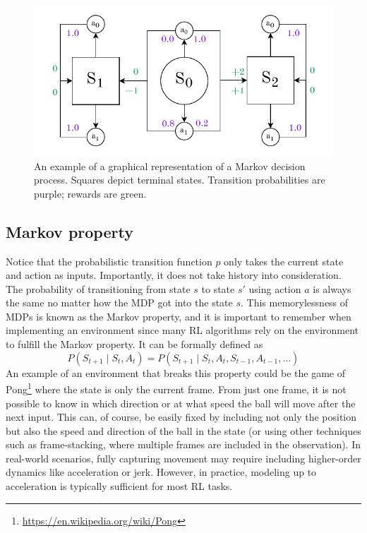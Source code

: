 \documentclass[
  digital,     %
  oneside,     %
  nosansbold,  %
  nocolorbold, %
  lof,         %
  lot,         %
]{fithesis4}
\begin{document}
\begin{figure}
    \centering
    \includegraphics[width=1\linewidth]{diagrams/mdp.pdf}
    \caption{An example of a graphical representation of a Markov decision process. Squares depict terminal states. Transition probabilities are purple; rewards are green.}
    \label{fig:mdp}
\end{figure}

\subsection{Markov property}
Notice that the probabilistic transition function $p$ only takes the current state and action as inputs. Importantly, it does not take history into consideration. The probability of transitioning from state $s$ to state $s'$ using action $a$ is always the same no matter how the MDP got into the state $s$. This memorylessness of MDPs is known as the Markov property, and it is important to remember when implementing an environment since many RL algorithms rely on the environment to fulfill the Markov property. It can be formally defined as
\begin{equation}
P(S_{t+1}\mid S_t,A_t)=P(S_{t+1}\mid S_t,A_t,S_{t-1},A_{t-1}, \dotsc)
\end{equation}
An example of an environment that breaks this property could be the game of Pong\footnote{\url{https://en.wikipedia.org/wiki/Pong}} where the state is only the current frame. From just one frame, it is not possible to know in which direction or at what speed the ball will move after the next input. This can, of course, be easily fixed by including not only the position but also the speed and direction of the ball in the state (or using other techniques such as frame-stacking, where multiple frames are included in the observation). In real-world scenarios, fully capturing movement may require including higher-order dynamics like acceleration or jerk. However, in practice, modeling up to acceleration is typically sufficient for most RL tasks.
\end{document}
